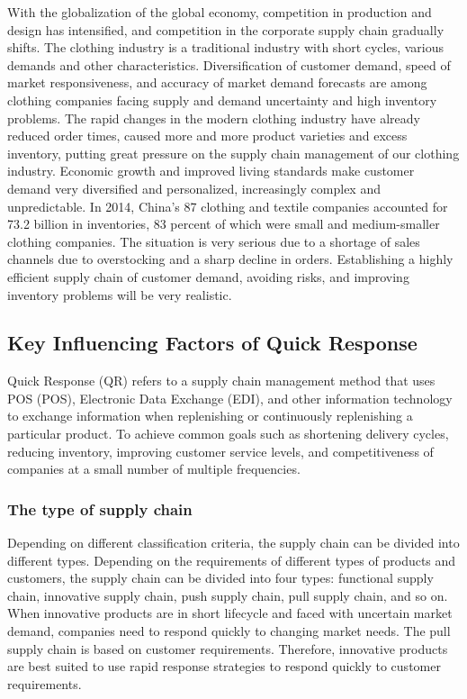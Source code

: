 \documentclass[12pt,a4paper]{article}
\begin{document}
With the globalization of the global economy, competition in production
and design has intensified, and competition in the corporate supply
chain gradually shifts. The clothing industry is a traditional industry
with short cycles, various demands and other characteristics.
Diversification of customer demand, speed of market responsiveness, and
accuracy of market demand forecasts are among clothing companies facing
supply and demand uncertainty and high inventory problems. The rapid
changes in the modern clothing industry have already reduced order
times, caused more and more product varieties and excess inventory,
putting great pressure on the supply chain management of our clothing
industry. Economic growth and improved living standards make customer
demand very diversified and personalized, increasingly complex and
unpredictable. In 2014, China's 87 clothing and textile companies
accounted for 73.2 billion in inventories, 83 percent of which were
small and medium-smaller clothing companies. The situation is very
serious due to a shortage of sales channels due to overstocking and a
sharp decline in orders. Establishing a highly efficient supply chain of
customer demand, avoiding risks, and improving inventory problems will
be very realistic.

\hypertarget{key-influencing-factors-of-quick-response}{%
\subsection{Key Influencing Factors of Quick
Response}\label{key-influencing-factors-of-quick-response}}

Quick Response (QR) refers to a supply chain management method that uses
POS (POS), Electronic Data Exchange (EDI), and other information
technology to exchange information when replenishing or continuously
replenishing a particular product. To achieve common goals such as
shortening delivery cycles, reducing inventory, improving customer
service levels, and competitiveness of companies at a small number of
multiple frequencies.

\hypertarget{the-type-of-supply-chain}{%
\subsubsection{The type of supply
chain}\label{the-type-of-supply-chain}}

Depending on different classification criteria, the supply chain can be
divided into different types. Depending on the requirements of different
types of products and customers, the supply chain can be divided into
four types: functional supply chain, innovative supply chain, push
supply chain, pull supply chain, and so on. When innovative products are
in short lifecycle and faced with uncertain market demand, companies
need to respond quickly to changing market needs. The pull supply chain
is based on customer requirements. Therefore, innovative products are
best suited to use rapid response strategies to respond quickly to
customer requirements.
\end{document}
